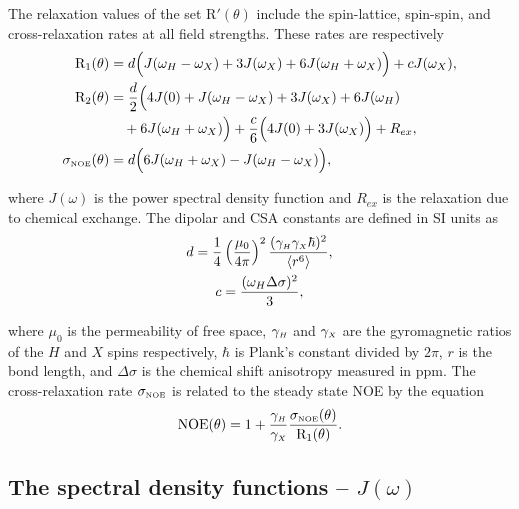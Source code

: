 \begin{htmlonly}
\begin{htmlonly}
The relaxation values of the set R$'(\theta)$ include the spin-lattice, spin-spin, and cross-relaxation rates at all field strengths.  These rates are respectively \citep{Abragam61}
\begin{subequations}
\begin{align}
    \mathrm{R}_1(\theta) &= d \Big( J(\omega_H - \omega_X) + 3J(\omega_X) + 6J(\omega_H + \omega_X) \Big) + cJ(\omega_X),     \label{eq: R1} \\
    \mathrm{R}_2(\theta) &= \frac{d}{2} \Big( 4J(0) + J(\omega_H - \omega_X) + 3J(\omega_X) + 6J(\omega_H)                    \nonumber \\
        & \quad + 6J(\omega_H + \omega_X) \Big) + \frac{c}{6} \Big( 4J(0) + 3J(\omega_X) \Big) + R_{ex},              \label{eq: R2} \\  
    \sigma_{\scriptscriptstyle \mathrm{NOE}}(\theta) &= d \Big( 6J(\omega_H + \omega_X) - J(\omega_H - \omega_X) \Big),                              \label{eq: sigma_NOE}
\end{align}
\end{subequations}

\noindent where $J(\omega)$ is the power spectral density function and $R_{ex}$ is the relaxation due to chemical exchange.  The dipolar and CSA constants are defined in SI units as
\begin{gather}
 d = \frac{1}{4} \left(\frac{\mu_0}{4\pi}\right)^2 \frac{(\gamma_{\scriptscriptstyle H} \gamma_{\scriptscriptstyle X} \hbar)^2}{\langle r^6 \rangle}, \label{eq: dipolar constant} \\
 c = \frac{(\omega_H \Delta\sigma)^2}{3}, \label{eq: CSA constant}
\end{gather}

\noindent where $\mu_0$ is the permeability of free space, $\gamma_{\scriptscriptstyle H}$ and $\gamma_{\scriptscriptstyle X}$ are the gyromagnetic ratios of the $H$ and $X$ spins respectively, $\hbar$ is Plank's constant divided by $2\pi$, $r$ is the bond length, and $\Delta\sigma$ is the chemical shift anisotropy measured in ppm.  The cross-relaxation rate $\sigma_{\scriptscriptstyle \mathrm{NOE}}$ is related to the steady state NOE by the equation
\begin{equation} \label{eq: NOE}
 \mathrm{NOE}(\theta) = 1 + \frac{\gamma_{\scriptscriptstyle H}}{\gamma_{\scriptscriptstyle X}} \frac{\sigma_{\scriptscriptstyle \mathrm{NOE}}(\theta)}{\mathrm{R}_1(\theta)}.
\end{equation}



\begin{latexonly}
    \subsection{The spectral density functions -- $J(\omega)$}
\end{latexonly}
\begin{htmlonly}

\end{htmlonly}
\end{htmlonly}
\end{htmlonly}

